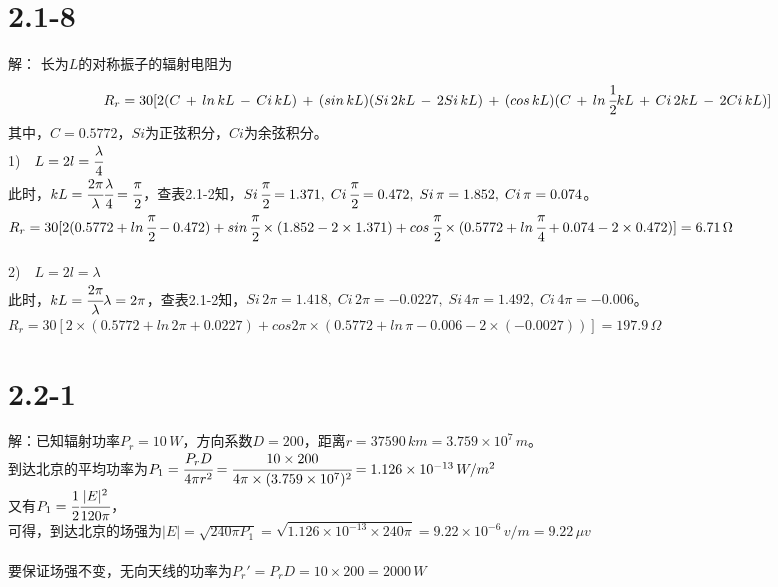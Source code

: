 \documentclass[a4paper,11pt]{article}
\begin{document}
\section{2.1-8}
解： 长为$L$的对称振子的辐射电阻为$$R_r=30[2(C\,+\,ln\,kL\,-\,Ci\,kL)\,+\,(sin\,kL)(Si\,2kL\,-\,2Si\,kL)\,+\,(cos\,kL)(C\,+\,ln\,\cfrac{1}{2}kL\,+\,Ci\,2kL\,-\,2Ci\,kL)]$$
其中，$C=0.5772$，$Si$为正弦积分，$Ci$为余弦积分。
\\
1)$\quad L=2l=\cfrac{\lambda}{4}$\\
此时，$kL=\cfrac{2\pi}{\lambda}\cfrac{\lambda}{4}=\cfrac{\pi}{2}$，查表2.1-2知，$Si\,\cfrac{\pi}{2}=1.371,\;Ci\,\cfrac{\pi}{2}=0.472,\;Si\,\pi=1.852,\;Ci\,\pi=0.074$。\\
$R_r=30[2(0.5772+ln\,\cfrac{\pi}{2}-0.472)+sin\,\cfrac{\pi}{2}\times (1.852-2\times 1.371)+cos\,\cfrac{\pi}{2}\times (0.5772+ln\,\cfrac{\pi}{4}+0.074-2\times 0.472)]=6.71\,\Omega$\\
\\
2)$\quad L=2l=\lambda$\\
 此时，$kL=\cfrac{2\pi}{\lambda}\lambda=2\pi$，查表2.1-2知，$Si\,2\pi=1.418,\;Ci\,2\pi=-0.0227,\;Si\,4\pi=1.492,\;Ci\,4\pi=-0.006$。\\
$R_r=30[2\times (0.5772+ln\,2\pi+0.0227)+cos2\pi\times (0.5772+ln\,\pi-0.006-2\times (-0.0027))]=197.9\,\Omega$

\section{2.2-1}
解：已知辐射功率$P_r=10\,W$，方向系数$D=200$，距离$r=37590\,km=3.759\times 10^7\,m$。\\
到达北京的平均功率为$P_1=\cfrac{P_rD}{4\pi r^2}=\cfrac{10\times 200}{4\pi\times (3.759\times 10^7)^2}=1.126\times 10^{-13}\,W/m^2$\\
又有$P_1=\cfrac{1}{2}\cfrac{|E|^2}{120\pi}$，\\
可得，到达北京的场强为$|E|=\sqrt{240\pi P_1}=\sqrt{1.126\times 10^{-13}\times 240\pi}=9.22\times 10^{-6}\,v/m=9.22\,\mu v$\\
\\
要保证场强不变，无向天线的功率为$P_r'=P_rD=10\times 200=2000\,W$\\
\\
\end{document}
